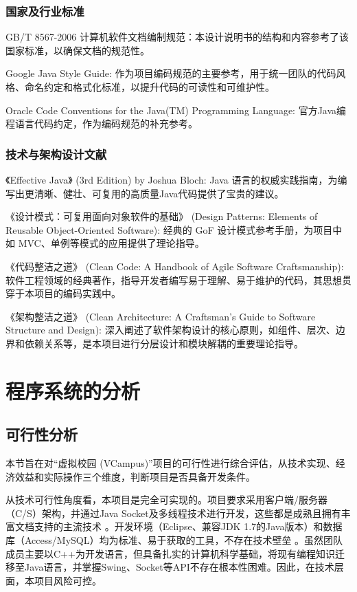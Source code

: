 \documentclass[a4paper]{ctexart}
\begin{document}
\subsubsection{国家及行业标准}

GB/T 8567-2006 计算机软件文档编制规范：本设计说明书的结构和内容参考了该国家标准，以确保文档的规范性。

Google Java Style Guide: 作为项目编码规范的主要参考，用于统一团队的代码风格、命名约定和格式化标准，以提升代码的可读性和可维护性。

Oracle Code Conventions for the Java(TM) Programming Language: 官方Java编程语言代码约定，作为编码规范的补充参考。

\subsubsection{技术与架构设计文献}

《Effective Java》 (3rd Edition) by Joshua Bloch: Java 语言的权威实践指南，为编写出更清晰、健壮、可复用的高质量Java代码提供了宝贵的建议。

《设计模式：可复用面向对象软件的基础》 (Design Patterns: Elements of Reusable Object-Oriented Software): 经典的 GoF 设计模式参考手册，为项目中如 MVC、单例等模式的应用提供了理论指导。

《代码整洁之道》 (Clean Code: A Handbook of Agile Software Craftsmanship): 软件工程领域的经典著作，指导开发者编写易于理解、易于维护的代码，其思想贯穿于本项目的编码实践中。

《架构整洁之道》 (Clean Architecture: A Craftsman's Guide to Software Structure and Design): 深入阐述了软件架构设计的核心原则，如组件、层次、边界和依赖关系等，是本项目进行分层设计和模块解耦的重要理论指导。

\section{程序系统的分析}

\subsection{可行性分析}

本节旨在对“虚拟校园 (VCampus)”项目的可行性进行综合评估，从技术实现、经济效益和实际操作三个维度，判断项目是否具备开发条件。

从技术可行性角度看，本项目是完全可实现的。项目要求采用客户端/服务器（C/S）架构，并通过Java Socket及多线程技术进行开发，这些都是成熟且拥有丰富文档支持的主流技术 。开发环境（Eclipse、兼容JDK 1.7的Java版本）和数据库（Access/MySQL）均为标准、易于获取的工具，不存在技术壁垒 。虽然团队成员主要以C++为开发语言，但具备扎实的计算机科学基础，将现有编程知识迁移至Java语言，并掌握Swing、Socket等API不存在根本性困难。因此，在技术层面，本项目风险可控。
\end{document}
